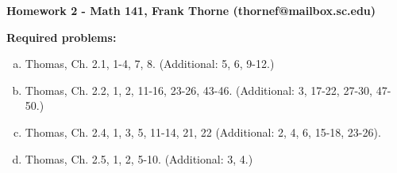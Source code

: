 \documentclass[12pt]{article}
\begin{document}
\setlength{\topmargin}{-2mm}





\begin{center}{\bf Homework 2 - Math 141, Frank Thorne (thornef@mailbox.sc.edu)}
\end{center}

{\bf Required problems:}

\begin{enumerate}[(a)]
\item
Thomas, Ch. 2.1, 1-4, 7, 8. (Additional: 5, 6, 9-12.)

\item
Thomas, Ch. 2.2, 1, 2, 11-16, 23-26, 43-46. (Additional: 3, 17-22, 27-30, 47-50.)

\item
Thomas, Ch. 2.4, 1, 3, 5, 11-14, 21, 22 (Additional: 2, 4, 6, 15-18, 23-26).

\item
Thomas, Ch. 2.5, 1, 2, 5-10. (Additional: 3, 4.)

\end{enumerate}
\end{document}
